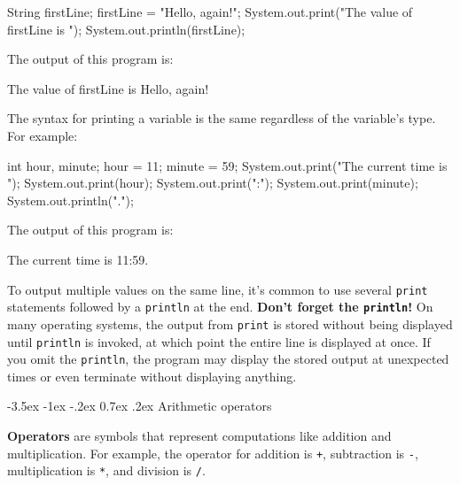 \documentclass[12pt]{book}
\makeatletter
\theoremstyle{exercise}
\newcommand{\java}[1]{\verb"#1"}
\renewcommand{\section}{\@startsection {section}{1}{\z@}%
    {-3.5ex \@plus -1ex \@minus -.2ex}%
    {0.7ex \@plus.2ex}%
    {\normalfont\Large\bfseries}}
\newcommand{\java}[1]{\lstinline{#1}} %
\makeatother
\begin{document}
\begin{code}
    String firstLine;
    firstLine = "Hello, again!";
    System.out.print("The value of firstLine is ");
    System.out.println(firstLine);
\end{code}

The output of this program is:

\begin{stdout}
The value of firstLine is Hello, again!
\end{stdout}


The syntax for printing a variable is the same regardless of the variable's type.
For example:

\begin{code}
    int hour, minute;
    hour = 11;
    minute = 59;
    System.out.print("The current time is ");
    System.out.print(hour);
    System.out.print(":");
    System.out.print(minute);
    System.out.println(".");
\end{code}

The output of this program is:

\begin{stdout}
The current time is 11:59.
\end{stdout}

To output multiple values on the same line, it's common to use several \java{print} statements followed by a \java{println} at the end.
{\bf Don't forget the \java{println}!}
On many operating systems, the output from \java{print} is stored without being displayed until \java{println} is invoked, at which point the entire line is displayed at once.
If you omit the \java{println}, the program may display the stored output at unexpected times or even terminate without displaying anything.


\section{Arithmetic operators}
\label{sec:arithops}



{\bf Operators} are symbols that represent computations like addition and multiplication.
For example, the operator for addition is \java{+}, subtraction is \java{-}, multiplication is \java{*}, and division is \java{/}.
\end{document}
